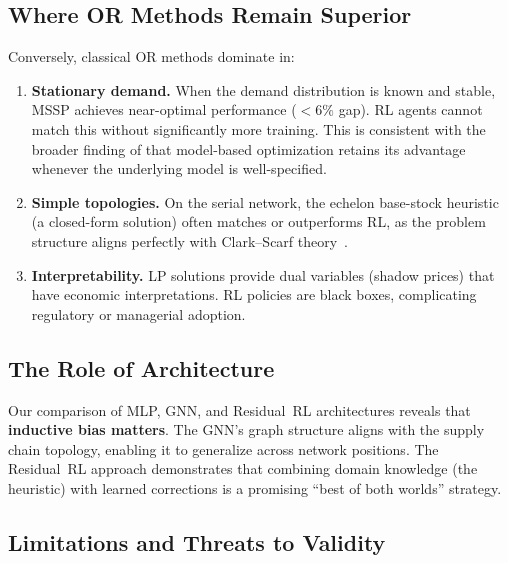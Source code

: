 \documentclass[preprint,12pt]{elsarticle}
\begin{document}
\subsection{Where OR Methods Remain Superior}

Conversely, classical OR methods dominate in:

\begin{enumerate}
  \item \textbf{Stationary demand.} When the demand distribution is known
        and stable, MSSP achieves near-optimal performance ($<6\%$ gap).
        RL agents cannot match this without significantly more training.
        This is consistent with the broader finding of
        \citet{lu2021review} that model-based optimization retains its
        advantage whenever the underlying model is well-specified.

  \item \textbf{Simple topologies.} On the serial network, the echelon
        base-stock heuristic (a closed-form solution) often matches or
        outperforms RL, as the problem structure aligns perfectly with
        Clark--Scarf theory~\citep{clark1960optimal}.

  \item \textbf{Interpretability.} LP solutions provide dual variables
        (shadow prices) that have economic interpretations. RL policies
        are black boxes, complicating regulatory or managerial adoption.
\end{enumerate}

\subsection{The Role of Architecture}

Our comparison of MLP, GNN, and Residual~RL architectures reveals that
\textbf{inductive bias matters}. The GNN's graph structure aligns with
the supply chain topology, enabling it to generalize across network
positions. The Residual~RL approach demonstrates that combining domain
knowledge (the heuristic) with learned corrections is a promising
``best of both worlds'' strategy.

\subsection{Limitations and Threats to Validity}\label{sec:audit}
\end{document}
